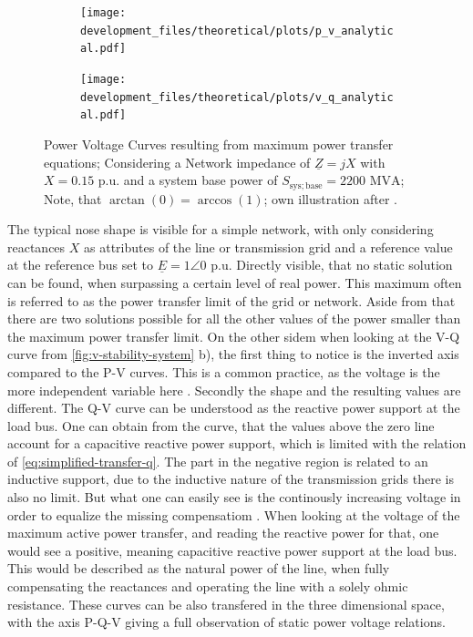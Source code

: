 \begin{figure}[htbp!]
    \centering
    \begin{subfigure}[b]{.49\linewidth}
        \texttt{[image: development\_files/theoretical/plots/p\_v\_analytical.pdf]}
    \end{subfigure}
    \begin{subfigure}[b]{.49\linewidth}
        \texttt{[image: development\_files/theoretical/plots/v\_q\_analytical.pdf]}
    \end{subfigure}
    \caption[Power Voltage Curves resulting from maximum power transfer equations]{Power Voltage Curves resulting from maximum power transfer equations; Considering a Network impedance of $\underline{Z}=jX$ with $X=0.15\text{ p.u.}$ and a system base power of $S_\mathrm{sys;base}=2200\text{ MVA}$; Note, that $\arctan(0) = \arccos(1)$; own illustration after \autocite{machowski_2020,kundur_2022,cutsem_1998}.}
    \label{fig:v-stability-system}
\end{figure}

The typical nose shape is visible for a simple network, with only considering reactances $X$ as attributes of the line or transmission grid and a reference value at the reference bus set to $\underline{E}=1\angle0$ p.u.
Directly visible, that no static solution can be found, when surpassing a certain level of real power. 
This maximum often is referred to as the power transfer limit of the grid or network.
Aside from that there are two solutions possible for all the other values of the power smaller than the maximum power transfer limit.
On the other sidem when looking at the V-Q curve from \autoref{fig:v-stability-system} b), the first thing to notice is the inverted axis compared to the P-V curves.
This is a common practice, as the voltage is the more independent variable here \autocite{kundur_2022}.
Secondly the shape and the resulting values are different.
The Q-V curve can be understood as the reactive power support at the load bus.
One can obtain from the curve, that the values above the zero line account for a capacitive reactive power support, which is limited with the relation of \autoref{eq:simplified-transfer-q}.
The part in the negative region is related to an inductive support, due to the inductive nature of the transmission grids there is also no limit.
But what one can easily see is the continously increasing voltage in order to equalize the missing compensatiom \autocite{kundur_2022}.
When looking at the voltage of the maximum active power transfer, and reading the reactive power for that, one would see a positive, meaning capacitive reactive power support at the load bus.
This would be described as the natural power of the line, when fully compensating the reactances and operating the line with a solely ohmic resistance.
These curves can be also transfered in the three dimensional space, with the axis P-Q-V giving a full observation of static power voltage relations.

